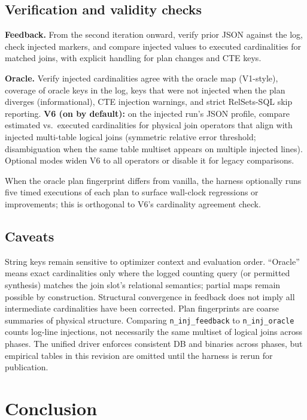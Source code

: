 \documentclass[sigconf,nonacm]{acmart}
\begin{document}
\subsection{Verification and validity checks}

\textbf{Feedback.} From the second iteration onward, verify prior JSON against the log, check injected markers, and compare injected values to executed cardinalities for matched joins, with explicit handling for plan changes and CTE keys.

\textbf{Oracle.} Verify injected cardinalities agree with the oracle map (V1-style), coverage of oracle keys in the log, keys that were not injected when the plan diverges (informational), CTE injection warnings, and strict RelSets-SQL skip reporting. \textbf{V6 (on by default):} on the injected run's JSON profile, compare estimated vs.\ executed cardinalities for physical join operators that align with injected multi-table logical joins (symmetric relative error threshold; disambiguation when the same table multiset appears on multiple injected lines). Optional modes widen V6 to all operators or disable it for legacy comparisons.

When the oracle plan fingerprint differs from vanilla, the harness optionally runs five timed executions of each plan to surface wall-clock regressions or improvements; this is orthogonal to V6's cardinality agreement check.

\subsection{Caveats}

String keys remain sensitive to optimizer context and evaluation order. ``Oracle'' means exact cardinalities only where the logged counting query (or permitted synthesis) matches the join slot's relational semantics; partial maps remain possible by construction. Structural convergence in feedback does not imply all intermediate cardinalities have been corrected. Plan fingerprints are coarse summaries of physical structure. Comparing \texttt{n\_inj\_feedback} to \texttt{n\_inj\_oracle} counts log-line injections, not necessarily the same multiset of logical joins across phases. The unified driver enforces consistent DB and binaries across phases, but empirical tables in this revision are omitted until the harness is rerun for publication.

\section{Conclusion}




\appendix

\end{document}
